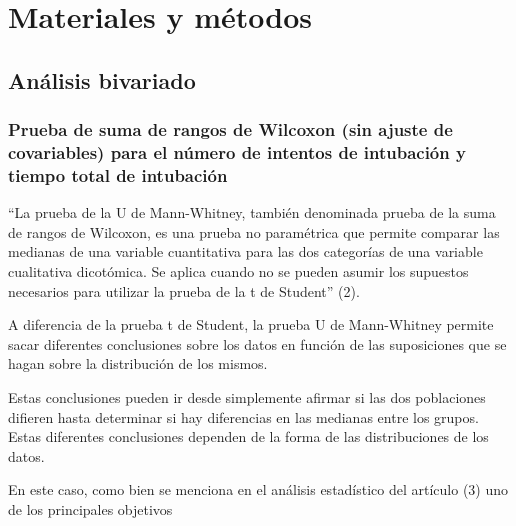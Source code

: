 \documentclass[
]{article}
\begin{document}
\hypertarget{materiales-y-muxe9todos}{%
\section{Materiales y métodos}\label{materiales-y-muxe9todos}}

\hypertarget{anuxe1lisis-bivariado}{%
\subsection{Análisis bivariado}\label{anuxe1lisis-bivariado}}

\hypertarget{prueba-de-suma-de-rangos-de-wilcoxon-sin-ajuste-de-covariables-para-el-nuxfamero-de-intentos-de-intubaciuxf3n-y-tiempo-total-de-intubaciuxf3n}{%
\subsubsection{Prueba de suma de rangos de Wilcoxon (sin ajuste de
covariables) para el número de intentos de intubación y tiempo total de
intubación}\label{prueba-de-suma-de-rangos-de-wilcoxon-sin-ajuste-de-covariables-para-el-nuxfamero-de-intentos-de-intubaciuxf3n-y-tiempo-total-de-intubaciuxf3n}}

``La prueba de la U de Mann-Whitney, también denominada prueba de la
suma de rangos de Wilcoxon, es una prueba no paramétrica que permite
comparar las medianas de una variable cuantitativa para las dos
categorías de una variable cualitativa dicotómica. Se aplica cuando no
se pueden asumir los supuestos necesarios para utilizar la prueba de la
t de Student'' (2).

A diferencia de la prueba t de Student, la prueba U de Mann-Whitney
permite sacar diferentes conclusiones sobre los datos en función de las
suposiciones que se hagan sobre la distribución de los mismos.

Estas conclusiones pueden ir desde simplemente afirmar si las dos
poblaciones difieren hasta determinar si hay diferencias en las medianas
entre los grupos. Estas diferentes conclusiones dependen de la forma de
las distribuciones de los datos.

En este caso, como bien se menciona en el análisis estadístico del
artículo (3) uno de los principales objetivos
\end{document}
